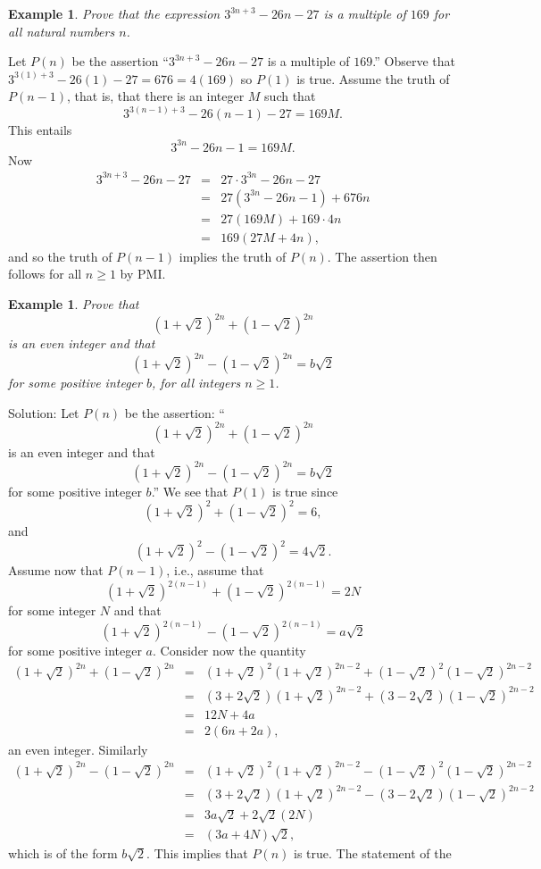 \documentclass[11pt, openany]{book}
\theoremstyle{change} \theoremheaderfont{\blue\sffamily\bfseries}
\newtheorem{exa}[thm]{Example}
\theoremstyle{nonumberplain} \theoremheaderfont{\sffamily\bfseries}
\newcommand{\í}{\'{\i}}
\begin{document}
\begin{exa}
Prove that the expression $3^{3n + 3} - 26n - 27$ is a multiple of
$169$ for all natural numbers $n$.
\end{exa}
Let $P(n)$ be the assertion ``$3^{3n + 3} - 26n - 27$ is a
multiple of $169$.'' Observe that $3^{3(1) + 3} - 26(1) - 27 = 676
= 4(169)$ so $P(1)$ is true. Assume the truth of $P(n - 1)$, that
is, that  there is an integer $M$ such that
$$3^{3(n - 1) + 3} - 26(n - 1) - 27 = 169M.$$ This entails
$$3^{3n} - 26n - 1 = 169M.$$
Now
$$
\begin{array}{lll}
3^{3n + 3} - 26n - 27 & = & 27\cdot 3^{3n} - 26n - 27 \\
&  = & 27(3^{3n} - 26n - 1) + 676n \\
& = & 27(169M) + 169\cdot 4n \\
& = & 169(27M + 4n),
\end{array}
$$and so  the truth of $P(n - 1)$ implies the truth of $P(n)$. The assertion then follows for all
$n \geq 1$ by PMI.
\begin{exa}
Prove that
$$(1 + \sqrt{2})^{2n} + (1 - \sqrt{2})^{2n}$$ is an even integer and that
$$(1 + \sqrt{2})^{2n} - (1 - \sqrt{2})^{2n} = b\sqrt{2}$$for some positive integer
$b$, for all integers $n \geq 1$.
\end{exa}
Solution: Let $P(n)$ be the assertion: ``$$(1 + \sqrt{2})^{2n} +
(1 - \sqrt{2})^{2n}$$ is an even integer and that
$$(1 + \sqrt{2})^{2n} - (1 - \sqrt{2})^{2n} = b\sqrt{2}$$for some positive integer
$b$.'' We see that $P(1)$ is true since
$$(1 + \sqrt{2})^2 + (1 - \sqrt{2})^2 = 6,$$and
$$(1 + \sqrt{2})^2 - (1 - \sqrt{2})^2 = 4\sqrt{2}.$$Assume now that $P(n - 1)$, i.e., assume that
$$(1 + \sqrt{2})^{2(n - 1)} + (1 - \sqrt{2})^{2(n - 1)} = 2N$$ for some integer $N$ and that
$$(1 + \sqrt{2})^{2(n - 1)} - (1 - \sqrt{2})^{2(n - 1)} = a\sqrt{2}$$for some positive integer
$a$. Consider now the quantity
$$
\begin{array}{lll}
(1 + \sqrt{2})^{2n} + (1 - \sqrt{2})^{2n} & = &
(1 + \sqrt{2})^2(1 + \sqrt{2})^{2n - 2} + (1 - \sqrt{2})^2(1 - \sqrt{2})^{2n - 2} \\
& = & (3 + 2\sqrt{2})(1 + \sqrt{2})^{2n - 2} + (3 - 2\sqrt{2})(1 - \sqrt{2})^{2n - 2} \\
& = & 12N + 4a \\
& = & 2(6n + 2a),
\end{array}
$$an even integer. Similarly
$$
\begin{array}{lll}
(1 + \sqrt{2})^{2n} - (1 - \sqrt{2})^{2n} & = &
(1 + \sqrt{2})^2(1 + \sqrt{2})^{2n - 2} - (1 - \sqrt{2})^2(1 - \sqrt{2})^{2n - 2} \\
& = & (3 + 2\sqrt{2})(1 + \sqrt{2})^{2n - 2} - (3 - 2\sqrt{2})(1 - \sqrt{2})^{2n - 2} \\
& = & 3a\sqrt{2} + 2\sqrt{2}(2N) \\
& = & (3a + 4N)\sqrt{2},
\end{array}
$$which is of the form $b\sqrt{2}$. This implies that $P(n)$ is true. The statement of the
\end{document}
